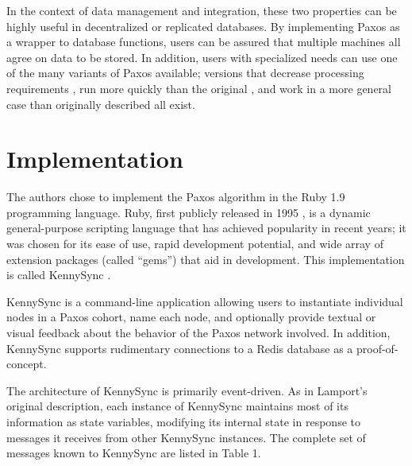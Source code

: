 \documentclass{acm_proc_article-sp}
\begin{document}
In the context of data management and integration, these two properties can be
highly useful in decentralized or replicated databases. By implementing Paxos as
a wrapper to database functions, users can be assured that multiple machines all
agree on data to be stored. In addition, users with specialized needs can use
one of the many variants of Paxos available; versions that decrease processing
requirements \cite{cheap-paxos}, run more quickly than the original
\cite{fast-paxos}, and work in a more general case than originally described
\cite{generalized-paxos} all exist.

\section{Implementation}

The authors chose to implement the Paxos algorithm in the Ruby 1.9 programming
language. Ruby, first publicly released in 1995 \cite{about-ruby}, is a dynamic
general-purpose scripting language that has achieved popularity in recent years;
it was chosen for its ease of use, rapid development potential, and wide array
of extension packages (called ``gems'') that aid in development. This
implementation is called KennySync \cite{kennysync}.

KennySync is a command-line application allowing users to instantiate individual
nodes in a Paxos cohort, name each node, and optionally provide textual or
visual feedback about the behavior of the Paxos network involved. In addition,
KennySync supports rudimentary connections to a Redis database as a
proof-of-concept.

The architecture of KennySync is primarily event-driven. As in Lamport's
original description, each instance of KennySync maintains most of its
information as state variables, modifying its internal state in response to
messages it receives from other KennySync instances. The complete set of
messages known to KennySync are listed in Table 1.
\end{document}
